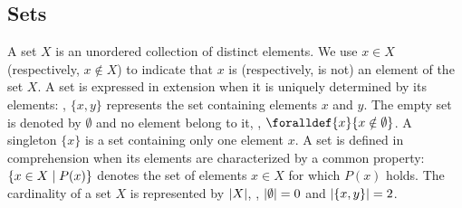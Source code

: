 \subsection{Sets}


A set $X$ is an unordered collection of distinct elements. We use $x \in X$ (respectively, $x \notin X$) to indicate that $x$ is (respectively, is not) an element of the set $X$. A set is expressed in extension when it is uniquely determined by its elements: \eg, $\{x, y\}$ represents the set containing elements $x$ and $y$. The empty set is denoted by $\emptyset$ and no element belong to it, \ie, $\foralldef{x}{x \notin \emptyset}$.
A singleton $\{x\}$ is a set containing only one element $x$.
A set is defined in comprehension when its elements are characterized by a common property: $\{x \in X \mid P(x)\}$ denotes the set of elements $x\in X$ for which $P(x)$ holds.
The cardinality of a set $X$ is represented by $|X|$, \eg, $|\emptyset| = 0$ and $|\{x, y\}| = 2$.

